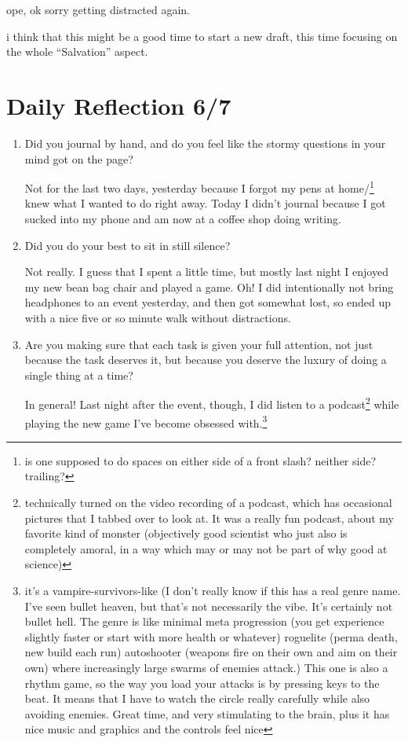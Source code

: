 \documentclass[12pt]{article}
\newcommand{\say}[1]{``#1''}
\renewcommand{\,}{\textsuperscript{,}}
\begin{document}
ope, ok sorry getting distracted again.

i think that this might be a good time to start a new draft, this time focusing on the whole \say{Salvation} aspect.

\section{Daily Reflection 6/7}

\begin{enumerate}

\item Did you journal by hand, and do you feel like the stormy questions in your mind got on the page?

Not for the last two days, yesterday because I forgot my pens at home/\footnote{is one supposed to do spaces on either side of a front slash? neither side? trailing?} knew what I wanted to do right away.  
Today I didn't journal because I got sucked into my phone and am now at a coffee shop doing writing.

\item Did you do your best to sit in still silence?

Not really. I guess that I spent a little time, but mostly last night I enjoyed my new bean bag chair and played a game.  
Oh! I did intentionally not bring headphones to an event yesterday, and then got somewhat lost, so ended up with a nice five or so minute walk without distractions.

\item Are you making sure that each task is given your full attention, not just because the task deserves it, but because you deserve the luxury of doing a single thing at a time?

In general! Last night after the event, though, I did listen to a podcast\footnote{technically turned on the video recording of a podcast, which has occasional pictures that I tabbed over to look at. It was a really fun podcast, about my favorite kind of monster (objectively good scientist who just also is completely amoral, in a way which may or may not be part of why good at science)} while playing the new game I've become obsessed with.\footnote{it's a vampire-survivors-like (I don't really know if this has a real genre name. I've seen bullet heaven, but that's not necessarily the vibe. It's certainly not bullet hell. The genre is like minimal meta progression (you get experience slightly faster or start with more health or whatever) roguelite (perma death, new build each run) autoshooter (weapons fire on their own and aim on their own) where increasingly large swarms of enemies attack.) This one is also a rhythm game, so the way you load your attacks is by pressing keys to the beat. It means that I have to watch the circle really carefully while also avoiding enemies. Great time, and very stimulating to the brain, plus it has nice music and graphics and the controls feel nice}


\end{enumerate}
\end{document}
